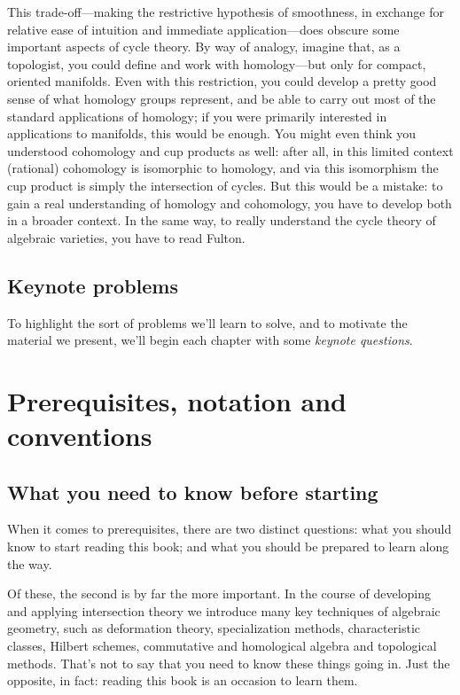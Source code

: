 This trade-off---making the restrictive hypothesis of smoothness, in exchange for relative ease of intuition and immediate application---does obscure some important aspects of cycle theory. By way of analogy, imagine that, as a topologist, you could define and work with homology---but only for compact, oriented manifolds. Even with this restriction, you could develop a pretty good sense of what homology groups represent, and be able to carry out most of the standard applications of homology; if you were primarily interested in applications to manifolds, this would be enough.
You might even think you understood cohomology and cup products as well: after all, in this limited context (rational) cohomology is isomorphic to homology, and via this isomorphism the cup product is simply the intersection of cycles. But this would be a mistake: to gain a real understanding of homology and cohomology, you have to develop both in a broader context. In the same way, to really understand the cycle theory of algebraic varieties, you have to read Fulton. 

\subsection{Keynote problems} To highlight the sort of problems we'll  learn to solve, and to motivate the material we present, we'll begin each chapter with some {\it keynote questions}. 


\section{Prerequisites, notation and conventions}

\subsection{What you need to know before starting}
When it comes to prerequisites, there are two distinct questions: what you should know to start reading this book; and what you should be prepared to learn along the way. 

Of these, the second is by far the more important.
In the course of developing and applying intersection theory we introduce many key techniques of algebraic geometry, such as deformation theory, specialization methods, characteristic classes, Hilbert schemes, commutative and homological algebra and topological methods. That's not to say that you need to know these things going in. Just the opposite, in fact: reading this book is an occasion to learn them.

